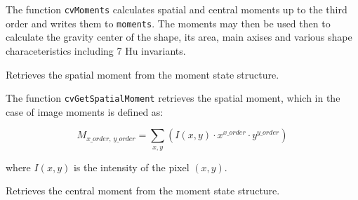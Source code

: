 The function \texttt{cvMoments} calculates spatial and central moments up to the third order and writes them to \texttt{moments}. The moments may then be used then to calculate the gravity center of the shape, its area, main axises and various shape characeteristics including 7 Hu invariants.

\label{GetSpatialMoment}

Retrieves the spatial moment from the moment state structure.


\begin{description}
\end{description}

The function \texttt{cvGetSpatialMoment} retrieves the spatial moment, which in the case of image moments is defined as:

\[
M_{x\_order, \, y\_order} = \sum_{x,y} (I(x,y) \cdot x^{x\_order} \cdot y^{y\_order})
\]

where $I(x,y)$ is the intensity of the pixel $(x, y)$.

\label{GetCentralMoment}

Retrieves the central moment from the moment state structure.


\begin{description}
\end{description}

